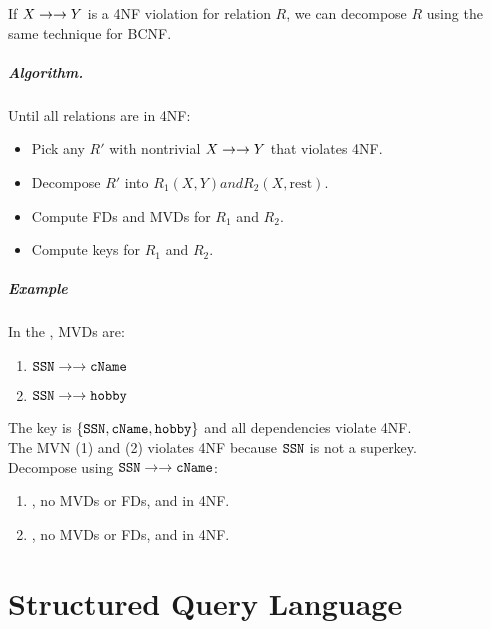 \documentclass[11pt,a4paper,twocolumn]{book}
\begin{document}
If $X \to\to Y$ is a 4NF violation for relation $R$, we can decompose $R$ using the same technique for BCNF.

\subsubsection{Algorithm.}

Until all relations are in 4NF:

\begin{itemize}
\item Pick any $R'$ with nontrivial $X \to\to Y$ that violates 4NF.
\item Decompose $R'$ into $R_1(X, Y) and R_2(X, \text{rest})$.
\item Compute FDs and MVDs for $R_1$ and $R_2$.
\item Compute keys for $R_1$ and $R_2$. 
\end{itemize}

\subsubsection{Example}

\newcommand{\mvd}{\mvn}

In the \ApplyExample, MVDs are:

\begin{enumerate}
\item $\C{SSN} \mvd \C{cName} $
\item $\C{SSN} \mvd \C{hobby}$
\end{enumerate}

The key is $\{ \texttt{SSN}, \texttt{cName}, \texttt{hobby} \}$ and all dependencies violate 4NF.\\

The MVN (1) and (2) violates 4NF because $\texttt{SSN}$ is not a superkey.\\

Decompose using $\C{SSN} \mvd \C{cName}$:

\begin{enumerate}
\item {}, no MVDs or FDs, and in 4NF.
\item {}, no MVDs or FDs, and in 4NF.
\end{enumerate}

\part{Structured Query Language}
\end{document}
